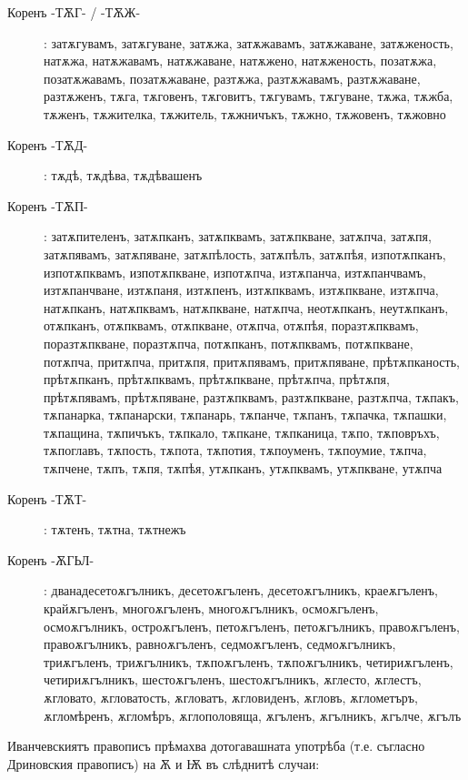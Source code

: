 \documentclass{article}
\begin{document}
\begin{description}
		\item[Коренъ -ТѪГ- / -ТѪЖ-]: затѫгувамъ, затѫгуване, затѫжа, затѫжавамъ, затѫжаване, затѫженость, натѫжа, натѫжавамъ, натѫжаване, натѫжено, натѫженость, позатѫжа, позатѫжавамъ, позатѫжаване, разтѫжа, разтѫжавамъ, разтѫжаване, разтѫженъ, тѫга, тѫговенъ, тѫговитъ, тѫгувамъ, тѫгуване, тѫжа, тѫжба, тѫженъ, тѫжителка, тѫжитель, тѫжничъкъ, тѫжно, тѫжовенъ, тѫжовно
		
		\item[Коренъ -ТѪД-]: тѫдѣ, тѫдѣва, тѫдѣвашенъ
		
		\item[Коренъ -ТѪП-]: затѫпителенъ, затѫпканъ, затѫпквамъ, затѫпкване, затѫпча, затѫпя, затѫпявамъ, затѫпяване, затѫпѣлость, затѫпѣлъ, затѫпѣя, изпотѫпканъ, изпотѫпквамъ, изпотѫпкване, изпотѫпча, изтѫпанча, изтѫпанчвамъ, изтѫпанчване, изтѫпаня, изтѫпенъ, изтѫпквамъ, изтѫпкване, изтѫпча, натѫпканъ, натѫпквамъ, натѫпкване, натѫпча, неотѫпканъ, неутѫпканъ, отѫпканъ, отѫпквамъ, отѫпкване, отѫпча, отѫпѣя, поразтѫпквамъ, поразтѫпкване, поразтѫпча, потѫпканъ, потѫпквамъ, потѫпкване, потѫпча, притѫпча, притѫпя, притѫпявамъ, притѫпяване, прѣтѫпканость, прѣтѫпканъ, прѣтѫпквамъ, прѣтѫпкване, прѣтѫпча, прѣтѫпя, прѣтѫпявамъ, прѣтѫпяване, разтѫпквамъ, разтѫпкване, разтѫпча, тѫпакъ, тѫпанарка, тѫпанарски, тѫпанарь, тѫпанче, тѫпанъ, тѫпачка, тѫпашки, тѫпащина, тѫпичъкъ, тѫпкало, тѫпкане, тѫпканица, тѫпо, тѫповръхъ, тѫпоглавъ, тѫпость, тѫпота, тѫпотия, тѫпоуменъ, тѫпоумие, тѫпча, тѫпчене, тѫпъ, тѫпя, тѫпѣя, утѫпканъ, утѫпквамъ, утѫпкване, утѫпча
		
		\item[Коренъ -ТѪТ-]: тѫтенъ, тѫтна, тѫтнежъ
	
		\item[Коренъ -ѪГЬЛ-]: дванадесетоѫгълникъ, десетоѫгъленъ, десетоѫгълникъ, краеѫгъленъ, крайѫгъленъ, многоѫгъленъ, многоѫгълникъ, осмоѫгъленъ, осмоѫгълникъ, остроѫгъленъ, петоѫгъленъ, петоѫгълникъ, правоѫгъленъ, правоѫгълникъ, равноѫгъленъ, седмоѫгъленъ, седмоѫгълникъ, триѫгъленъ, триѫгълникъ, тѫпоѫгъленъ, тѫпоѫгълникъ, четириѫгъленъ, четириѫгълникъ, шестоѫгъленъ, шестоѫгълникъ, ѫглесто, ѫглестъ, ѫгловато, ѫгловатость, ѫгловатъ, ѫгловиденъ, ѫгловъ, ѫглометъръ, ѫгломѣренъ, ѫгломѣръ, ѫглополовяща, ѫгъленъ, ѫгълникъ, ѫгълче, ѫгълъ

	\end{description}

Иванчевскиятъ правописъ прѣмахва дотогавашната употрѣба (т.е. съгласно Дриновския правописъ) на Ѫ и Ѭ въ слѣднитѣ случаи:
\end{document}
